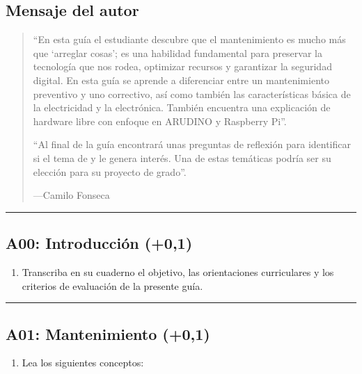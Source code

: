 \documentclass[letterpaper,10pt,spanish]{sphinxmanual}
\begin{document}
\subsection{Mensaje del autor}
\label{\detokenize{1_guias/10informatica/G1004:mensaje-del-autor}}\begin{quote}

\sphinxAtStartPar
“En esta guía el estudiante descubre que el mantenimiento es mucho más que ‘arreglar cosas’; es una habilidad fundamental para preservar la tecnología que nos rodea, optimizar recursos y garantizar la seguridad digital. En esta guía se aprende a diferenciar entre un mantenimiento preventivo y uno correctivo, así como también las características básica de la electricidad y la electrónica. También encuentra una explicación de hardware libre con enfoque en ARUDINO y Raspberry Pi”.

\sphinxAtStartPar
“Al final de la guía encontrará unas preguntas de reflexión para identificar si el tema de  y  le genera interés. Una de estas temáticas podría ser su elección para su proyecto de grado”.

\begin{flushright}
---Camilo Fonseca
\end{flushright}
\end{quote}


\bigskip\hrule\bigskip



\subsection{A00: Introducción (+0,1)}
\label{\detokenize{1_guias/10informatica/G1004:a00-introduccion-0-1}}
\sphinxAtStartPar
{}
\begin{enumerate}
%
\item {} 
\sphinxAtStartPar
Transcriba en su cuaderno el objetivo, las orientaciones curriculares y los criterios de evaluación de la presente guía.

\end{enumerate}


\bigskip\hrule\bigskip



\subsection{A01: Mantenimiento (+0,1)}
\label{\detokenize{1_guias/10informatica/G1004:a01-mantenimiento-0-1}}
\sphinxAtStartPar
{}
\begin{enumerate}
%
\item {} 
\sphinxAtStartPar
Lea los siguientes conceptos:

\end{enumerate}
\end{document}
